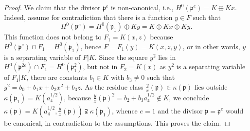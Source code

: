 \documentclass[12pt,reqno]{amsart}
\newcommand{\todoo}[2][]{\todo[size=tiny, #1]{#2}} %
\newcommand{\toda}[2][]{\todo[color=blue!30, #1]{#2}} %
\theoremstyle{definition}
\newcommand{\pp}{\mathfrak{p}}
\newcommand{\ka}{\kappa}
\begin{document}
\begin{proof}
We claim that the divisor $\pp^e$ is non-canonical, i.e., $H^0(\pp^e)=K\oplus Kx$.
Indeed, assume for contradiction that there is a function $y\in F$ such that
\[ H^0(\pp^e) = H^0(\pp_1) \oplus Ky = K \oplus Kx \oplus Ky. \]
This function does not belong to $F_1=K(x,z)$ because $H^0(\pp^e) \cap F_1 = H^0(\pp_1)$,
hence $F=F_1(y)=K(x,z,y)$, or in other words, $y$ is a separating variable of $F|K$.
Since the square $y^2$ lies in $H^0(\pp^{2e}) \cap F_1 = H^0(\pp_1^2)$, but not in $F_2=K(x)$ as $y^2$ is a separating variable of $F_1|K$,
there are constants $b_i \in K$ with $b_3\neq 0$ such that $y^2 = b_0 + b_1 x + b_2 x^2 + b_3 z$.
As the residue class $\frac yx(\pp) \in \ka(\pp)$ lies outside $\ka(\pp_1)=K(a_4^{1/2})$, because $\frac yx(\pp)^2 = b_2 + b_3 a_4^{1/2} \notin K$, we conclude $\ka(\pp)=K(a_4^{1/2}, \frac yx (\pp))  \supsetneqq \ka(\pp_1)$, whence $e=1$ and the divisor $\pp=\pp^e$ would be canonical, in contradiction to the assumptions. This proves the claim.


\end{proof}
\end{document}
